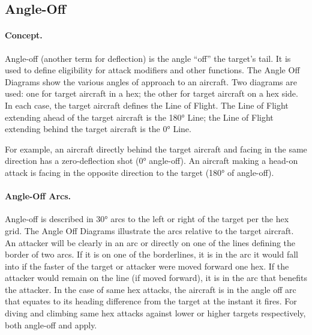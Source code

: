 \subsection{Angle-Off}

\paragraph{Concept.} Angle-off (another term for deflection) is the angle “off” the target's tail. It is used to define eligibility for attack modifiers and other functions. The Angle Off Diagrams show the various angles of approach to an aircraft. Two diagrams are used: one for target aircraft in a hex; the other for target aircraft on a hex side. In each case, the target aircraft defines the Line of Flight. The Line of Flight extending ahead of the target aircraft is the 180° Line; the Line of Flight extending behind the target aircraft is the 0° Line. 

For example, an aircraft directly behind the target aircraft and facing in the same direction has a zero-deflection shot (0° angle-off). An aircraft making a head-on attack is facing in the opposite direction to the target (180° of angle-off).

\paragraph{Angle-Off Arcs.} Angle-off is described in 30° arcs to the left or right of the target per the hex grid. The Angle Off Diagrams illustrate the arcs relative to the target aircraft. An attacker will be clearly in an arc or directly on one of the lines defining the border of two arcs. If it is on one of the borderlines, it is in the arc it would fall into if the faster of the target or attacker were moved forward one hex.   If the attacker would remain on the line (if moved forward), it is in the arc that benefits the attacker. In the case of same hex attacks, the aircraft is in the angle off arc that equates to its heading difference from the target at the instant it fires.  For diving and climbing same hex attacks against lower or higher targets respectively, both angle-off and  apply.

